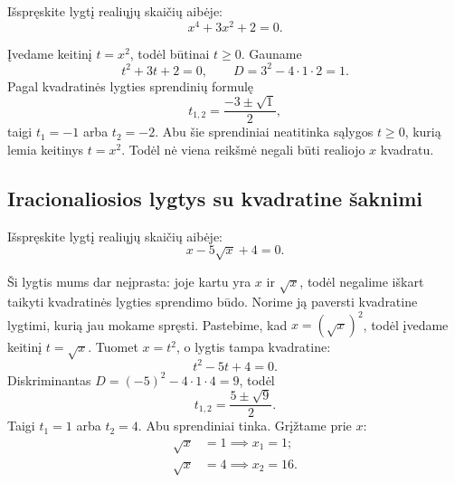 \documentclass[11pt,a4paper]{scrartcl}
\begin{document}
\begin{example}
Išspręskite lygtį realiųjų skaičių aibėje:
\begin{equation*}
x^4+3x^2+2=0.
\end{equation*}
\end{example}
\begin{solution}
Įvedame keitinį \(t=x^2\), todėl būtinai \(t\ge0\). Gauname
\begin{equation*}
t^2+3t+2=0,\qquad D=3^2-4\cdot1\cdot2=1.
\end{equation*}
Pagal kvadratinės lygties sprendinių formulę
\begin{equation*}
t_{1,2}=\frac{-3\pm\sqrt1}{2},
\end{equation*}
taigi \(t_1=-1\) arba \(t_2=-2\). Abu šie sprendiniai neatitinka sąlygos \(t\ge0\), kurią lemia keitinys \(t=x^2\). Todėl nė viena reikšmė negali būti realiojo \(x\) kvadratu.
\end{solution}

\subsection{Iracionaliosios lygtys su kvadratine šaknimi}

\begin{example}
Išspręskite lygtį realiųjų skaičių aibėje:
\begin{equation*}
x-5\sqrt{x}+4=0.
\end{equation*}
\end{example}
\begin{solution}
Ši lygtis mums dar neįprasta: joje kartu yra \(x\) ir \(\sqrt{x}\), todėl negalime iškart taikyti kvadratinės lygties sprendimo būdo. Norime ją paversti kvadratine lygtimi, kurią jau mokame spręsti. Pastebime, kad \(x=(\sqrt{x})^2\), todėl įvedame keitinį \(t=\sqrt{x}\). Tuomet \(x=t^2\), o lygtis tampa kvadratine:
\begin{equation*}
t^2-5t+4=0.
\end{equation*}
Diskriminantas \(D=(-5)^2-4\cdot1\cdot4=9\), todėl
\begin{equation*}
t_{1,2}=\frac{5\pm\sqrt9}{2}.
\end{equation*}
Taigi \(t_1=1\) arba \(t_2=4\). Abu sprendiniai tinka. Grįžtame prie \(x\):
\begin{equation*}
\begin{aligned}
\sqrt{x}&=1 \implies x_1=1;\\
\sqrt{x}&=4 \implies x_2=16.
\end{aligned}
\end{equation*}
\end{solution}
\end{document}
